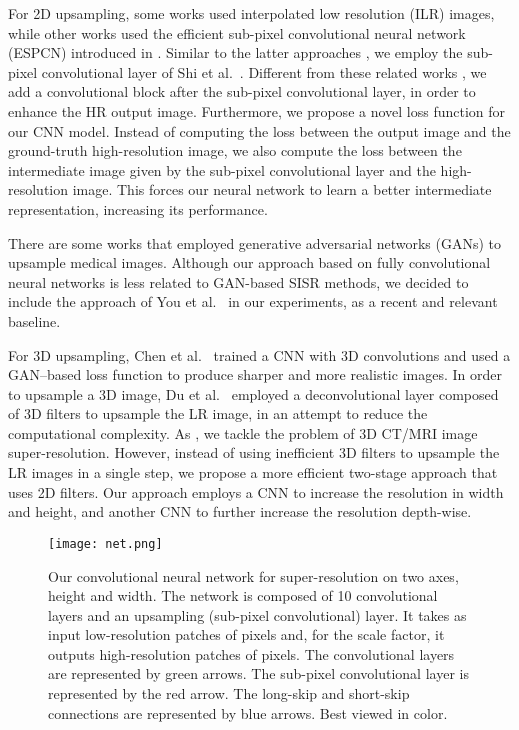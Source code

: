 \documentclass{ieeeaccess}
\begin{document}
For 2D upsampling, some works \cite{Sert-MH-2019, Du-NC-2019, Jurek-BBE-2019, Shi-JBHI-2018} used interpolated low resolution (ILR) images, while other works \cite{Du-AS-2019, Hatvani-TRPMS-2018, Yu-ICIP-2017, Zhao-TMI-2019} used the efficient sub-pixel convolutional neural network (ESPCN) introduced in \cite{Shi-CVPR-2016}. Similar to the latter approaches \cite{Du-AS-2019, Hatvani-TRPMS-2018, Yu-ICIP-2017, Zhao-TMI-2019}, we employ the sub-pixel convolutional layer of Shi et al.~\cite{Shi-CVPR-2016}. Different from these related works \cite{Du-AS-2019, Hatvani-TRPMS-2018, Yu-ICIP-2017, Zhao-TMI-2019}, we add a convolutional block after the sub-pixel convolutional layer, in order to enhance the HR output image. Furthermore, we propose a novel loss function for our CNN model. Instead of computing the loss between the output image and the ground-truth high-resolution image, we also compute the loss between the intermediate image given by the sub-pixel convolutional layer and the high-resolution image. This forces our neural network to learn a better intermediate representation, increasing its performance. 

There are some works \cite{Chen-MICCAI-2018, Mahapatra-CMIG-2019, You-TMI-2019} that employed generative adversarial networks (GANs) \cite{Goodfellow-NIPS-2014} to upsample medical images. Although our approach based on fully convolutional neural networks is less related to GAN-based SISR methods, we decided to include the approach of You et al.~\cite{You-TMI-2019} in our experiments, as a recent and relevant baseline.

For 3D upsampling, Chen et al.~\cite{Chen-MICCAI-2018} trained a CNN with 3D convolutions and used a GAN--based loss function to produce sharper and more realistic images. In order to upsample a 3D image, Du et al.~\cite{Du-BIBM-2018} employed a deconvolutional layer composed of 3D filters to upsample the LR image, in an attempt to reduce the computational complexity. As \cite{Chen-MICCAI-2018, Du-BIBM-2018, Huang-CVPR-2017, Oktay-MICCAI-2016}, we tackle the problem of 3D CT/MRI image super-resolution. However, instead of using inefficient 3D filters to upsample the LR images in a single step, we propose a more efficient two-stage approach that uses 2D filters. Our approach employs a CNN to increase the resolution in width and height, and another CNN to further increase the resolution depth-wise.

\begin{figure*}[t!]
\centering
\texttt{[image: net.png]}
\caption{Our convolutional neural network for super-resolution on two axes, height and width. The network is composed of 10 convolutional layers and an upsampling (sub-pixel convolutional) layer. It takes as input low-resolution patches of  pixels and, for the  scale factor, it outputs high-resolution patches of  pixels. The convolutional layers are represented by green arrows. The sub-pixel convolutional layer is represented by the red arrow. The long-skip and short-skip connections are represented by blue arrows. Best viewed in color.}
\label{fig_architecture}
\end{figure*}
\end{document}
